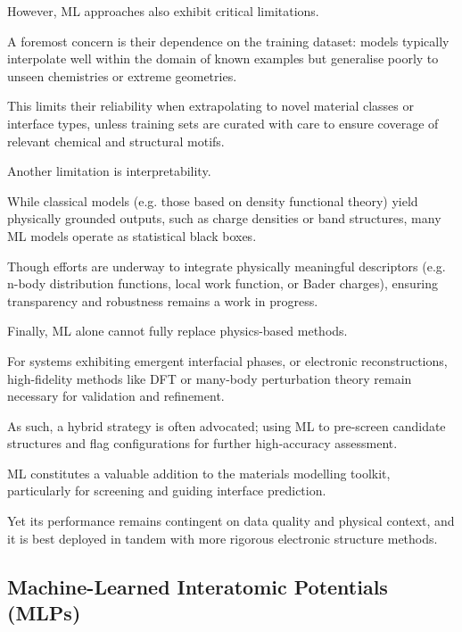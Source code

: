 
However, ML approaches also exhibit critical limitations.

A foremost concern is their dependence on the training dataset: models typically interpolate well within the domain of
known examples but generalise poorly to unseen chemistries or extreme geometries.

This limits their reliability when extrapolating to novel material classes or interface types, unless training sets are
curated with care to ensure coverage of relevant chemical and structural motifs.


Another limitation is interpretability.

While classical models (e.g. those based on density functional theory) yield physically grounded outputs, such as charge
densities or band structures, many ML models operate as statistical black boxes.

Though efforts are underway to integrate physically meaningful descriptors (e.g. n-body distribution functions, local
work function, or Bader charges), ensuring transparency and robustness remains a work in progress.


Finally, ML alone cannot fully replace physics-based methods.

For systems exhibiting emergent interfacial phases, or electronic reconstructions, high-fidelity methods like DFT or
many-body perturbation theory remain necessary for validation and refinement.

As such, a hybrid strategy is often advocated; using ML to pre-screen candidate structures and flag configurations for
further high-accuracy assessment.


ML constitutes a valuable addition to the materials modelling toolkit, particularly for screening
and guiding interface prediction.

Yet its performance remains contingent on data quality and physical context, and it is best deployed in tandem with more
rigorous electronic structure methods.


\subsection{Machine-Learned Interatomic Potentials (MLPs)}

